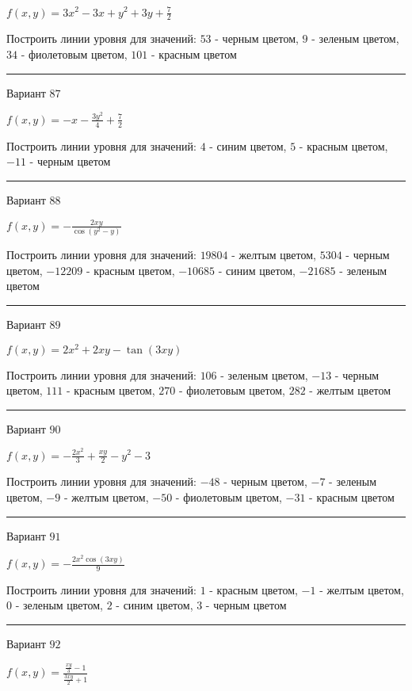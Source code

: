 \documentclass[11pt]{report}
\begin{document}
$f(x, y) = 3 x^{2} - 3 x + y^{2} + 3 y + \frac{7}{2}$

Построить линии уровня для значений: $53$ - черным цветом, $9$ - зеленым цветом, $34$ - фиолетовым цветом, $101$ - красным цветом
\begin{center}
\noindent\rule{8cm}{0.4pt}
\end{center}
Вариант $87$


$f(x, y) = - x - \frac{3 y^{2}}{4} + \frac{7}{2}$

Построить линии уровня для значений: $4$ - синим цветом, $5$ - красным цветом, $-11$ - черным цветом
\begin{center}
\noindent\rule{8cm}{0.4pt}
\end{center}
Вариант $88$


$f(x, y) = - \frac{2 x y}{\cos{\left(y^{2} - y \right)}}$

Построить линии уровня для значений: $19804$ - желтым цветом, $5304$ - черным цветом, $-12209$ - красным цветом, $-10685$ - синим цветом, $-21685$ - зеленым цветом
\begin{center}
\noindent\rule{8cm}{0.4pt}
\end{center}
Вариант $89$


$f(x, y) = 2 x^{2} + 2 x y - \tan{\left(3 x y \right)}$

Построить линии уровня для значений: $106$ - зеленым цветом, $-13$ - черным цветом, $111$ - красным цветом, $270$ - фиолетовым цветом, $282$ - желтым цветом
\begin{center}
\noindent\rule{8cm}{0.4pt}
\end{center}
Вариант $90$


$f(x, y) = - \frac{2 x^{2}}{3} + \frac{x y}{2} - y^{2} - 3$

Построить линии уровня для значений: $-48$ - черным цветом, $-7$ - зеленым цветом, $-9$ - желтым цветом, $-50$ - фиолетовым цветом, $-31$ - красным цветом
\begin{center}
\noindent\rule{8cm}{0.4pt}
\end{center}
Вариант $91$


$f(x, y) = - \frac{2 x^{2} \cos{\left(3 x y \right)}}{9}$

Построить линии уровня для значений: $1$ - красным цветом, $-1$ - желтым цветом, $0$ - зеленым цветом, $2$ - синим цветом, $3$ - черным цветом
\begin{center}
\noindent\rule{8cm}{0.4pt}
\end{center}
Вариант $92$


$f(x, y) = \frac{\frac{x y}{3} - 1}{\frac{3 x y}{2} + 1}$
\end{document}

